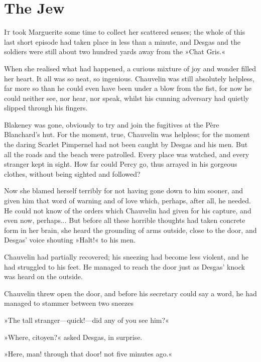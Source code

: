 
\chapter{The Jew}
\lettrine[lines=4]{I}{t} took Marguerite some time to collect her scattered senses; the whole of this last short episode had taken place in less than a minute, and Desgas and the soldiers were still about two hundred yards away from the »Chat Gris.«

When she realised what had happened, a curious mixture of joy and wonder filled her heart. It all was so neat, so ingenious. Chauvelin was still absolutely helpless, far more so than he could even have been under a blow from the fist, for now he could neither see, nor hear, nor speak, whilst his cunning adversary had quietly slipped through his fingers.

Blakeney was gone, obviously to try and join the fugitives at the Père Blanchard's hut. For the moment, true, Chauvelin was helpless; for the moment the daring Scarlet Pimpernel had not been caught by Desgas and his men. But all the roads and the beach were patrolled. Every place was watched, and every stranger kept in sight. How far could Percy go, thus arrayed in his gorgeous clothes, without being sighted and followed?

Now she blamed herself terribly for not having gone down to him sooner, and given him that word of warning and of love which, perhaps, after all, he needed. He could not know of the orders which Chauvelin had given for his capture, and even now, perhaps... But before all these horrible thoughts had taken concrete form in her brain, she heard the grounding of arms outside, close to the door, and Desgas' voice shouting »Halt!« to his men.

Chauvelin had partially recovered; his sneezing had become less violent, and he had struggled to his feet. He managed to reach the door just as Desgas' knock was heard on the outside.

Chauvelin threw open the door, and before his secretary could say a word, he had managed to stammer between two sneezes\longdash


»The tall stranger\allowbreak---\allowbreak quick!\allowbreak---\allowbreak did any of you see him?«

»Where, citoyen?« asked Desgas, in surprise.

»Here, man! through that door! not five minutes ago.«


